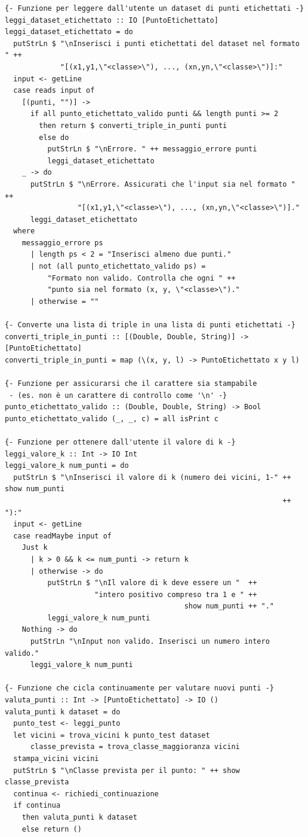 \documentclass[11pt]{article}
\theoremstyle{definition}
\begin{document}
\begin{verbatim}
{- Funzione per leggere dall'utente un dataset di punti etichettati -}
leggi_dataset_etichettato :: IO [PuntoEtichettato]
leggi_dataset_etichettato = do
  putStrLn $ "\nInserisci i punti etichettati del dataset nel formato " ++
             "[(x1,y1,\"<classe>\"), ..., (xn,yn,\"<classe>\")]:"
  input <- getLine
  case reads input of
    [(punti, "")] ->
      if all punto_etichettato_valido punti && length punti >= 2
        then return $ converti_triple_in_punti punti
        else do
          putStrLn $ "\nErrore. " ++ messaggio_errore punti
          leggi_dataset_etichettato
    _ -> do
      putStrLn $ "\nErrore. Assicurati che l'input sia nel formato " ++ 
                 "[(x1,y1,\"<classe>\"), ..., (xn,yn,\"<classe>\")]."
      leggi_dataset_etichettato
  where
    messaggio_errore ps
      | length ps < 2 = "Inserisci almeno due punti."
      | not (all punto_etichettato_valido ps) = 
          "Formato non valido. Controlla che ogni " ++ 
          "punto sia nel formato (x, y, \"<classe>\")."
      | otherwise = ""

{- Converte una lista di triple in una lista di punti etichettati -}
converti_triple_in_punti :: [(Double, Double, String)] -> [PuntoEtichettato]
converti_triple_in_punti = map (\(x, y, l) -> PuntoEtichettato x y l)

{- Funzione per assicurarsi che il carattere sia stampabile 
 - (es. non è un carattere di controllo come '\n' -}
punto_etichettato_valido :: (Double, Double, String) -> Bool
punto_etichettato_valido (_, _, c) = all isPrint c

{- Funzione per ottenere dall'utente il valore di k -}
leggi_valore_k :: Int -> IO Int
leggi_valore_k num_punti = do
  putStrLn $ "\nInserisci il valore di k (numero dei vicini, 1-" ++ show num_punti 
                                                                 ++ "):"
  input <- getLine
  case readMaybe input of
    Just k
      | k > 0 && k <= num_punti -> return k
      | otherwise -> do
          putStrLn $ "\nIl valore di k deve essere un "  ++ 
                     "intero positivo compreso tra 1 e " ++ 
                                          show num_punti ++ "."
          leggi_valore_k num_punti
    Nothing -> do
      putStrLn "\nInput non valido. Inserisci un numero intero valido."
      leggi_valore_k num_punti

{- Funzione che cicla continuamente per valutare nuovi punti -}
valuta_punti :: Int -> [PuntoEtichettato] -> IO ()
valuta_punti k dataset = do
  punto_test <- leggi_punto
  let vicini = trova_vicini k punto_test dataset
      classe_prevista = trova_classe_maggioranza vicini
  stampa_vicini vicini
  putStrLn $ "\nClasse prevista per il punto: " ++ show classe_prevista
  continua <- richiedi_continuazione
  if continua
    then valuta_punti k dataset
    else return ()


\end{verbatim}
\end{document}
